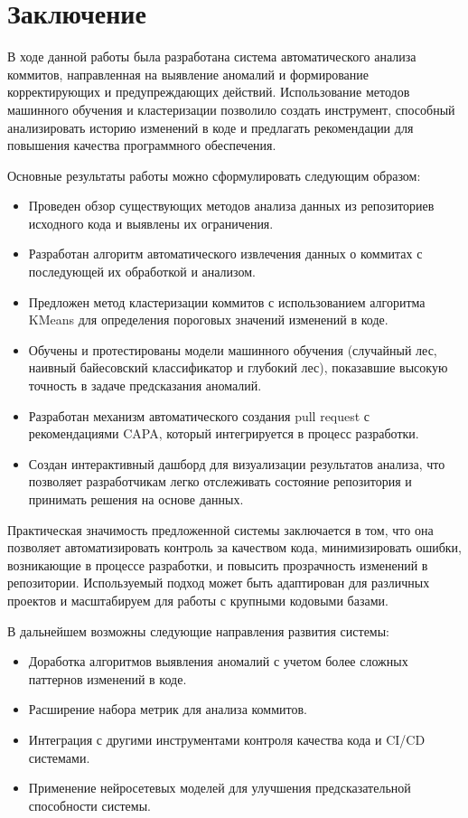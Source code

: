 \chapter*{Заключение} \label{ch-conclusion}

В ходе данной работы была разработана система автоматического анализа коммитов, направленная на выявление аномалий и формирование корректирующих и предупреждающих действий. Использование методов машинного обучения и кластеризации позволило создать инструмент, способный анализировать историю изменений в коде и предлагать рекомендации для повышения качества программного обеспечения.

Основные результаты работы можно сформулировать следующим образом:
\begin{itemize}
	\item Проведен обзор существующих методов анализа данных из репозиториев исходного кода и выявлены их ограничения.
	\item Разработан алгоритм автоматического извлечения данных о коммитах с последующей их обработкой и анализом.
	\item Предложен метод кластеризации коммитов с использованием алгоритма KMeans для определения пороговых значений изменений в коде.
	\item Обучены и протестированы модели машинного обучения (случайный лес, наивный байесовский классификатор и глубокий лес), показавшие высокую точность в задаче предсказания аномалий.
	\item Разработан механизм автоматического создания pull request с рекомендациями CAPA, который интегрируется в процесс разработки.
	\item Создан интерактивный дашборд для визуализации результатов анализа, что позволяет разработчикам легко отслеживать состояние репозитория и принимать решения на основе данных.
\end{itemize}

Практическая значимость предложенной системы заключается в том, что она позволяет автоматизировать контроль за качеством кода, минимизировать ошибки, возникающие в процессе разработки, и повысить прозрачность изменений в репозитории. Используемый подход может быть адаптирован для различных проектов и масштабируем для работы с крупными кодовыми базами.

В дальнейшем возможны следующие направления развития системы:
\begin{itemize}
	\item Доработка алгоритмов выявления аномалий с учетом более сложных паттернов изменений в коде.
	\item Расширение набора метрик для анализа коммитов.
	\item Интеграция с другими инструментами контроля качества кода и CI/CD системами.
	\item Применение нейросетевых моделей для улучшения предсказательной способности системы.
\end{itemize}

